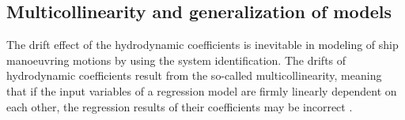 \subsection{Multicollinearity and generalization of models} \label{sec:multicollinearity}
The drift effect of the hydrodynamic coefficients is inevitable in modeling of ship manoeuvring motions by using the system identification. The drifts of hydrodynamic coefficients result from the so-called multicollinearity, meaning that if the input variables of a regression model are firmly linearly dependent on each other, the regression results of their coefficients may be incorrect \cite{luo_parameter_2016}.